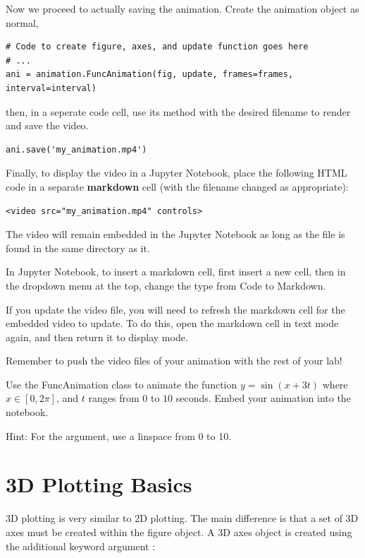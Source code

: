 Now we proceed to actually saving the animation.
Create the animation object as normal,
\begin{lstlisting}
# Code to create figure, axes, and update function goes here
# ...
ani = animation.FuncAnimation(fig, update, frames=frames, interval=interval)
\end{lstlisting}
then, in a seperate code cell, use its  method with the desired filename to render and save the video. 
\begin{lstlisting}
ani.save('my_animation.mp4')
\end{lstlisting}
Finally, to display the  video in a Jupyter Notebook, place the following HTML code in a separate \textbf{markdown} cell (with the filename changed as appropriate):
\begin{lstlisting}
<video src="my_animation.mp4" controls>
\end{lstlisting}
The video will remain embedded in the Jupyter Notebook as long as the  file is found in the same directory as it.

\begin{info}
In Jupyter Notebook, to insert a markdown cell, first insert a new cell, then in the dropdown menu at the top, change the type from Code to Markdown.

If you update the video file, you will need to refresh the markdown cell for the embedded video to update.
To do this, open the markdown cell in text mode again, and then return it to display mode.

Remember to push the video files of your animation with the rest of your lab!
\end{info}

\begin{problem}
Use the FuncAnimation class to animate the function $y=\sin(x+3t)$ where $x \in [0,2\pi]$, and $t$ ranges from $0$ to $10$ seconds. 
Embed your animation into the notebook.

Hint: For the  argument, use a linspace from 0 to 10.
\end{problem}


\section*{3D Plotting Basics}
3D plotting is very similar to 2D plotting.
The main difference is that a set of 3D axes must be created within the figure object.
A 3D axes object is created using the additional keyword argument :

